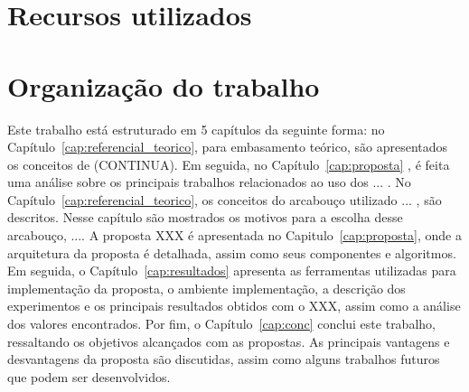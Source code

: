\section{Recursos utilizados}\label{sec:1_recursos_utilizados}

\section{Organização do trabalho}\label{sec:1_org}

Este trabalho está estruturado em 5 capítulos da seguinte forma: no Capítulo~\ref{cap:referencial_teorico}, para embasamento teórico, são apresentados os conceitos de (CONTINUA). Em seguida, no Capítulo~\ref{cap:proposta} , é feita uma análise sobre os principais trabalhos relacionados ao uso dos ... . No Capítulo~\ref{cap:referencial_teorico}, os conceitos do arcabouço utilizado ... , são descritos. Nesse capítulo são mostrados os motivos para a escolha desse arcabouço, .... A proposta XXX é apresentada no Capitulo~\ref{cap:proposta}, onde a arquitetura da proposta é detalhada, assim como seus componentes e algoritmos. Em seguida, o Capítulo~\ref{cap:resultados} apresenta as ferramentas utilizadas para implementação da proposta, o ambiente implementação, a descrição dos experimentos e os principais resultados obtidos com o XXX, assim como a análise dos valores encontrados. Por fim, o Capítulo~\ref{cap:conc} conclui este trabalho, ressaltando os objetivos alcançados com as propostas. As principais vantagens e desvantagens da proposta são discutidas, assim como alguns trabalhos futuros que podem ser desenvolvidos. 
